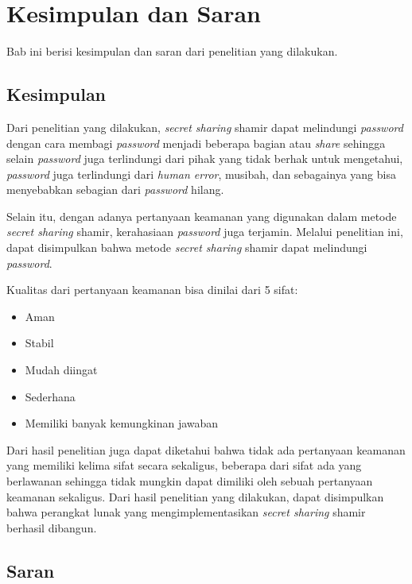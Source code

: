 \chapter{Kesimpulan dan Saran}
\label{chap:Kesimpulan dan Saran}

Bab ini berisi kesimpulan dan saran dari penelitian yang dilakukan.

\section{Kesimpulan}

Dari penelitian yang dilakukan, \textit{secret sharing} shamir dapat melindungi \textit{password} dengan cara membagi \textit{password} menjadi beberapa bagian atau \textit{share} sehingga selain \textit{password} juga terlindungi dari pihak yang tidak berhak untuk mengetahui, \textit{password} juga terlindungi dari \textit{human error}, musibah, dan sebagainya yang bisa menyebabkan sebagian dari \textit{password} hilang.

Selain itu, dengan adanya pertanyaan keamanan yang digunakan dalam metode \textit{secret sharing} shamir, kerahasiaan \textit{password} juga terjamin. Melalui penelitian ini, dapat disimpulkan bahwa metode \textit{secret sharing} shamir dapat melindungi \textit{password}.

Kualitas dari pertanyaan keamanan bisa dinilai dari 5 sifat:
\begin{itemize}
	\item Aman
	\item Stabil
	\item Mudah diingat
	\item Sederhana
	\item Memiliki banyak kemungkinan jawaban
\end{itemize}
Dari hasil penelitian juga dapat diketahui bahwa tidak ada pertanyaan keamanan yang memiliki kelima sifat secara sekaligus, beberapa dari sifat ada yang berlawanan sehingga tidak mungkin dapat dimiliki oleh sebuah pertanyaan keamanan sekaligus.
Dari hasil penelitian yang dilakukan, dapat disimpulkan bahwa perangkat lunak yang mengimplementasikan \textit{secret sharing} shamir berhasil dibangun.

\section{Saran}

